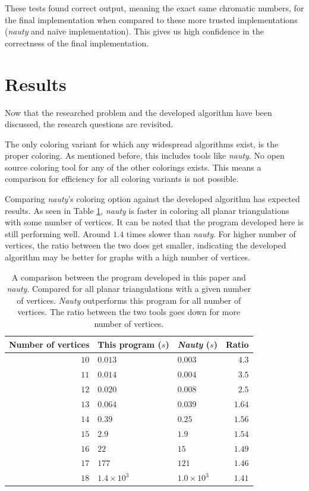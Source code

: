 \documentclass{article}
\begin{document}
These tests found correct output, meaning the exact same chromatic numbers, for the final implementation when compared to these more trusted implementations (\textit{nauty} and naive implementation). This gives us high confidence in the correctness of the final implementation.

\section{Results}
\label{sec:results}

Now that the researched problem and the developed algorithm have been discussed, the research questions are revisited. 

The only coloring variant for which any widespread algorithms exist, is the proper coloring. As mentioned before, this includes tools like \textit{nauty}. No open source coloring tool for any of the other colorings exists. This means a comparison for efficiency for all coloring variants is not possible.

Comparing \textit{nauty}'s coloring option against the developed algorithm has expected results. As seen in Table \ref{tab:nauty}, \textit{nauty} is faster in coloring all planar triangulations with some number of vertices. It can be noted that the program developed here is still performing well. Around $1.4$ times slower than \textit{nauty}. For higher number of vertices, the ratio between the two does get smaller, indicating the developed algorithm may be better for graphs with a high number of vertices.


\begin{table}
	\centering
	\begin{tabular}{r|ll|r} 
		\hline
		Number of vertices & This program ($s$) & \textit{Nauty} ($s$) & Ratio \\
		\hline
		$10$ & $0.013$ & $0.003$ & $4.3$ \\ 
		$11$ & $0.014$ & $0.004$ & $3.5$ \\
		$12$ & $0.020$ & $0.008$ & $2.5$ \\
		$13$ & $0.064$ & $0.039$ & $1.64$ \\
		$14$ & $0.39$ & $0.25$ & $1.56$ \\
		$15$ & $2.9$ & $1.9$ & $1.54$ \\
		$16$ & $22$ & $15$ & $1.49$ \\
		$17$ & $177$ & $121$ & $1.46$ \\
		$18$ & $1.4 \times 10^{3}$ & $1.0 \times 10^{3}$ & $1.41$
	\end{tabular}
	\caption{A comparison between the program developed in this paper and \textit{nauty}. Compared for all planar triangulations with a given number of vertices. \textit{Nauty} outperforms this program for all number of vertices. The ratio between the two tools goes down for more number of vertices.}\label{tab:nauty}
\end{table}
\end{document}
